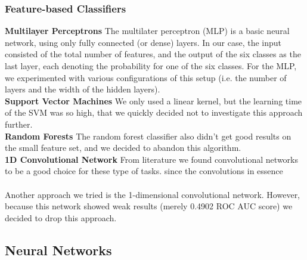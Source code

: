 \documentclass[10pt, a4paper]{article}
\begin{document}
\begin{multicols}{2}
		\subsubsection{Feature-based Classifiers}
		\label{sec:classifiers}
		\textbf{Multilayer Perceptrons}
		The multilater perceptron (MLP) is a basic neural network, using only fully connected (or dense) layers. In our case, the input consisted of the total number of features, and the output of the six classes as the last layer, each denoting the probability for one of the six classes. For the MLP, we experimented with various configurations of this setup (i.e. the number of layers and the width of the hidden layers).
		\\
		\textbf{Support Vector Machines}
		We only used a linear kernel, but the learning time of the SVM was so high, that we quickly decided not to investigate this approach further.
		\\
		\textbf{Random Forests}
		{The random forest classifier also didn't get good results on the small feature set, and we decided to abandon this algorithm.}
		\\
		\textbf{1D Convolutional Network}
		From literature we found convolutional networks to be a good choice for these type of tasks. since the convolutions in essence 
		\\
		\\
		Another approach we tried is the 1-dimensional convolutional network. However, because this network showed weak results (merely 0.4902 ROC AUC score) we decided to drop this approach.
		
		\subsection{Neural Networks}
		

\end{multicols}
\end{document}
